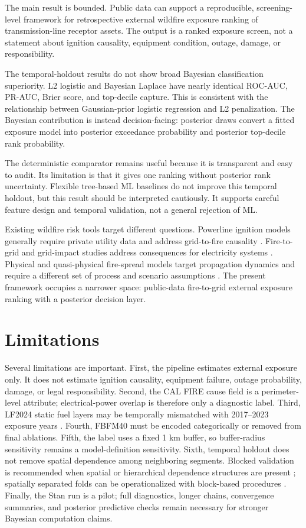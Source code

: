 \documentclass[11pt]{article}
\begin{document}
The main result is bounded. Public data can support a reproducible,
screening-level framework for retrospective external wildfire exposure ranking
of transmission-line receptor assets. The output is a ranked exposure screen,
not a statement about ignition causality, equipment condition, outage, damage,
or responsibility.

The temporal-holdout results do not show broad Bayesian classification
superiority. L2 logistic and Bayesian Laplace have nearly identical ROC-AUC,
PR-AUC, Brier score, and top-decile capture. This is consistent with the
relationship between Gaussian-prior logistic regression and L2 penalization.
The Bayesian contribution is instead decision-facing: posterior draws convert a
fitted exposure model into posterior exceedance probability and posterior
top-decile rank probability.

The deterministic comparator remains useful because it is transparent and easy
to audit. Its limitation is that it gives one ranking without posterior rank
uncertainty. Flexible tree-based ML baselines do not improve this temporal
holdout, but this result should be interpreted cautiously. It supports careful
feature design and temporal validation, not a general rejection of ML.

Existing wildfire risk tools target different questions. Powerline ignition
models generally require private utility data and address grid-to-fire
causality \citep{yao2022electricityWildfire}. Fire-to-grid and grid-impact
studies address consequences for electricity systems
\citep{dale2018californiaGrid,panossianElgindy2023wildfire}. Physical and
quasi-physical fire-spread models target propagation dynamics and require a
different set of process and scenario assumptions \citep{sullivan2009spread}.
The present framework occupies a narrower space: public-data fire-to-grid
external exposure ranking with a posterior decision layer.

\section{Limitations}

Several limitations are important. First, the pipeline estimates external
exposure only. It does not estimate ignition causality, equipment failure,
outage probability, damage, or legal responsibility. Second, the CAL FIRE cause
field is a perimeter-level attribute; electrical-power overlap is therefore
only a diagnostic label. Third, LF2024 static fuel layers may be temporally
mismatched with 2017--2023 exposure years \citep{landfire2024update}. Fourth,
FBFM40 must be encoded categorically or removed from final ablations. Fifth,
the label uses a fixed 1 km buffer, so buffer-radius sensitivity remains a
model-definition sensitivity. Sixth, temporal holdout does not remove spatial
dependence among neighboring segments. Blocked validation is recommended when
spatial or hierarchical dependence structures are present
\citep{roberts2017crossvalidation}; spatially separated folds can be
operationalized with block-based procedures \citep{valavi2019blockcv}. Finally,
the Stan run is a pilot; full diagnostics, longer chains, convergence
summaries, and posterior predictive checks remain necessary for stronger
Bayesian computation claims.
\end{document}
